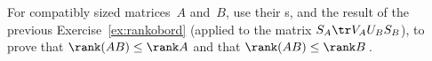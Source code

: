\begin{exercise} \label{ex:} 
For compatibly sized matrices~\(A\) and~\(B\), use their \svd{}s, and the result of the previous Exercise~\ref{ex:rankobord} (applied to the matrix \(S_A\tr V_AU_BS_B\)), to prove that \(\rank(AB)\leq\rank A\) and that \(\rank(AB)\leq\rank B\)\,.
\end{exercise}




\begin{comment}%
why, what caused X?
how did X occur?
what-if? what-if-not?
how does X compare with Y?
what is the evidence for X?
why is X important?
\end{comment}







